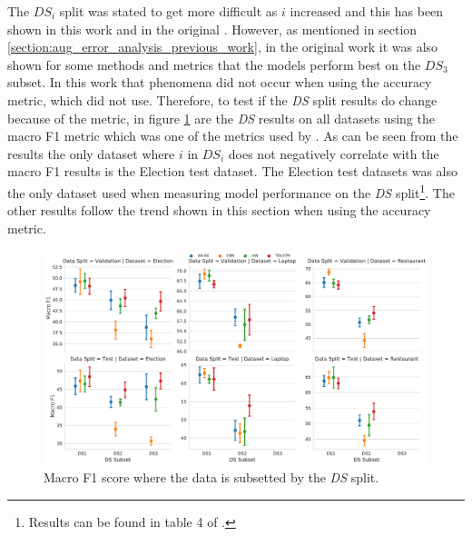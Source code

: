 The $DS_i$ split was stated to get more difficult as $i$ increased and this has been shown in this work and in the original \citep{wang-etal-2017-tdparse}. However, as mentioned in section \ref{section:aug_error_analysis_previous_work}, in the original work it was also shown for some methods and metrics that the models perform best on the $DS_3$ subset. In this work that phenomena did not occur when using the accuracy metric, which \citet{wang-etal-2017-tdparse} did not use. Therefore, to test if the \textit{DS} split results do change because of the metric, in figure \ref{fig:aug_baseline_sentiment_f1_ds_all} are the \textit{DS} results on all datasets using the macro F1 metric which was one of the metrics used by \citet{wang-etal-2017-tdparse}. As can be seen from the results the only dataset where $i$ in $DS_i$ does not negatively correlate with the macro F1 results is the Election test dataset. The Election test datasets was also the only dataset \citet{wang-etal-2017-tdparse} used when measuring model performance on the \textit{DS} split\footnote{Results can be found in table 4 of \citet{wang-etal-2017-tdparse}.}. The other results follow the trend shown in this section when using the accuracy metric. 

\begin{figure}[h!]
    \centering
    \includegraphics[scale=0.4]{images/augmentation/methods_performance/baseline/sentiment_f1_ds_all.pdf}
    \caption{Macro F1 score where the data is subsetted by the \textit{DS} split.}
    \label{fig:aug_baseline_sentiment_f1_ds_all}
\end{figure}

